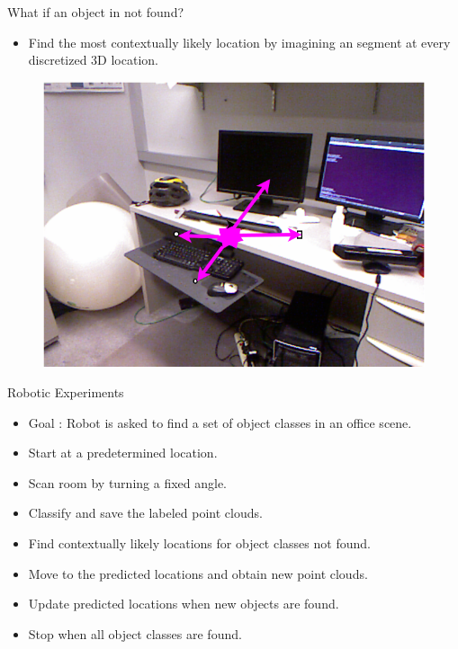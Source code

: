 \documentclass{beamer}
\begin{document}
\begin{frame}{What if an object in not found?}
\begin{itemize}
\item Find the most contextually likely location by imagining an segment at every discretized 3D location.
\end{itemize}
 \begin{figure}   
 \includegraphics[scale=0.2]{heatImage.png} 
 \end{figure}

\end{frame}


\begin{frame}{Robotic Experiments}

\begin{itemize}
\item Goal : Robot is asked to find a set of object classes in an office scene.
\item Start at a predetermined location. 
\item Scan room by turning a fixed angle.
\item Classify and save the labeled point clouds. 
\item Find contextually likely locations for object classes not found.
\item Move to the predicted locations and obtain new point clouds.
\item Update predicted locations when new objects are found.
\item Stop when all object classes are found.

\end{itemize}

\end{frame}
\end{document}
